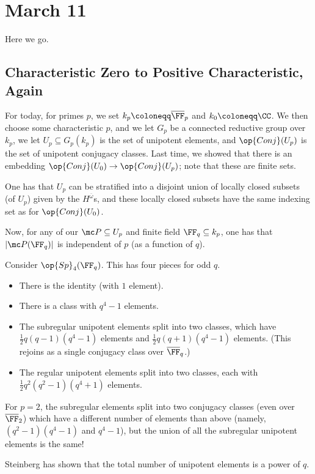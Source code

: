 \documentclass[../notes.tex]{subfiles}
\begin{document}
\section{March 11}
Here we go.

\subsection{Characteristic Zero to Positive Characteristic, Again}
For today, for primes $p$, we set $k_p\coloneqq\overline\FF_p$ and $k_0\coloneqq\CC$. We then choose some characteristic $p$, and we let $G_p$ be a connected reductive group over $k_p$, we let $U_p\subseteq G_p(k_p)$ is the set of unipotent elements, and $\op{Conj}(U_p)$ is the set of unipotent conjugacy classes. Last time, we showed that there is an embedding $\op{Conj}(U_0)\to\op{Conj}(U_p)$; note that these are finite sets.
\begin{remark}
	One has that $U_p$ can be stratified into a disjoint union of locally closed subsets (of $U_p$) given by the $H^{\overline\omega}$s, and these locally closed subsets have the same indexing set as for $\op{Conj}(U_0)$.
\end{remark}
Now, for any of our $\mc P\subseteq U_p$ and finite field $\FF_q\subseteq k_p$, one has that $\left|\mc P(\FF_q)\right|$ is independent of $p$ (as a function of $q$).
\begin{example}
	Consider $\op{Sp}_4(\FF_q)$. This has four pieces for odd $q$.
	\begin{itemize}
		\item There is the identity (with $1$ element).
		\item There is a class with $q^4-1$ elements.
		\item The subregular unipotent elements split into two classes, which have $\frac12q(q-1)\left(q^4-1\right)$ elements and $\frac12q(q+1)\left(q^4-1\right)$ elements. (This rejoins as a single conjugacy class over $\overline\FF_q$.)
		\item The regular unipotent elements split into two classes, each with $\frac12q^2\left(q^2-1\right)\left(q^4+1\right)$ elements.
	\end{itemize}
	For $p=2$, the subregular elements split into two conjugacy classes (even over $\overline\FF_2$) which have a different number of elements than above (namely, $\left(q^2-1\right)\left(q^4-1\right)$ and $q^4-1$), but the union of all the subregular unipotent elements is the same!
\end{example}
\begin{remark}
	Steinberg has shown that the total number of unipotent elements is a power of $q$.
\end{remark}
\end{document}
